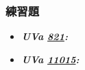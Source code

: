 \subsubsection*{練習題}
\begin{itemize}[label={\Checkmark}]
\item \textbf{\textit{UVa \href{http://uva.onlinejudge.org/external/8/821.html}{821}: }}\\

\item \textbf{\textit{UVa \href{http://uva.onlinejudge.org/external/110/11015.html}{11015}: }}\\

\end{itemize}